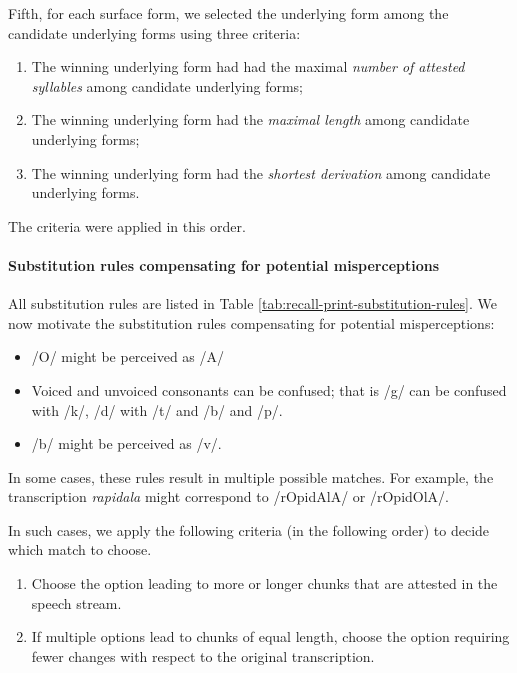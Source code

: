 \documentclass[
]{article}
\providecommand{\tightlist}{%
  \setlength{\itemsep}{0pt}\setlength{\parskip}{0pt}}
\begin{document}
Fifth, for each surface form, we selected the underlying form among the
candidate underlying forms using three criteria:

\begin{enumerate}
\def\labelenumi{\arabic{enumi}.}
\tightlist
\item
  The winning underlying form had had the maximal \emph{number of
  attested syllables} among candidate underlying forms;
\item
  The winning underlying form had the \emph{maximal length} among
  candidate underlying forms;
\item
  The winning underlying form had the \emph{shortest derivation} among
  candidate underlying forms.
\end{enumerate}

The criteria were applied in this order.

\paragraph{Substitution rules compensating for potential
misperceptions}\label{substitution-rules-compensating-for-potential-misperceptions}

All substitution rules are listed in Table
\ref{tab:recall-print-substitution-rules}. We now motivate the
substitution rules compensating for potential misperceptions:

\begin{itemize}
\tightlist
\item
  /O/ might be perceived as /A/
\item
  Voiced and unvoiced consonants can be confused; that is /g/ can be
  confused with /k/, /d/ with /t/ and /b/ and /p/.
\item
  /b/ might be perceived as /v/.
\end{itemize}

In some cases, these rules result in multiple possible matches. For
example, the transcription \emph{rapidala} might correspond to
/rOpidAlA/ or /rOpidOlA/.

In such cases, we apply the following criteria (in the following order)
to decide which match to choose.

\begin{enumerate}
\def\labelenumi{\arabic{enumi}.}
\tightlist
\item
  Choose the option leading to more or longer chunks that are attested
  in the speech stream.
\item
  If multiple options lead to chunks of equal length, choose the option
  requiring fewer changes with respect to the original transcription.
\end{enumerate}
\end{document}
